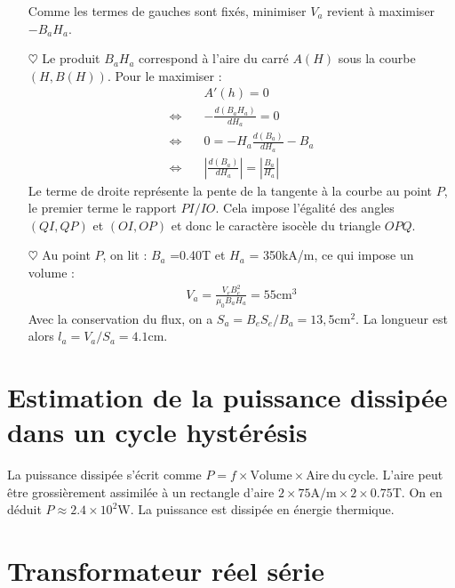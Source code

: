\documentclass{report}
\begin{document}
\begin{itemize}
	Comme les termes de gauches sont fixés, minimiser $V_a$ revient à maximiser $-B_aH_a$.

	\item[$\heartsuit$] Le produit $B_aH_a$ correspond à l'aire du carré $A(H)$ sous la courbe $(H,B(H))$. Pour le maximiser :
	\begin{align*}
		& A'(h)=0 \\
		\Leftrightarrow \quad & -\frac{d(B_aH_a)}{dH_a}=0 \\
		\Leftrightarrow \quad &0=-H_a\frac{d(B_a)}{dH_a}-B_a \\
		\Leftrightarrow \quad & \left|\frac{d(B_a)}{dH_a}\right|= \left|\frac{B_a}{H_a}\right|
	\end{align*}
	Le terme de droite représente la pente de la tangente à la courbe au point $P$, le premier terme le rapport $PI/IO$. Cela impose l'égalité des angles $(QI,QP)$ et $(OI,OP)$ et donc le caractère isocèle du triangle $OPQ$.
	
	\item[$\heartsuit$] Au point $P$, on lit : $B_a$ =0.40T et $H_a$ = 350kA/m, ce qui impose un volume :
	\begin{align*}
		V_a = \frac{V_eB_e^2}{\mu_0B_aH_a}=55\mathrm{cm}^3
	\end{align*}
Avec la conservation du flux, on a $S_a=B_eS_e/B_a=13,5\mathrm{cm}^2$. La longueur est alors $l_a=V_a/S_a = 4.1$cm.

\end{itemize}

\section*{Estimation de la puissance  dissipée dans un cycle hystérésis}

La puissance dissipée s'écrit comme $P=f\times \mathrm{Volume}\times \mathrm{Aire\ du\ cycle}$. L'aire peut être grossièrement assimilée à un rectangle d'aire $2\times75\mathrm{A/m}\times2\times0.75$T. On en déduit $P\approx2.4\times10^2$W. La puissance est dissipée en énergie thermique. 

\section*{Transformateur réel série}
\end{document}
